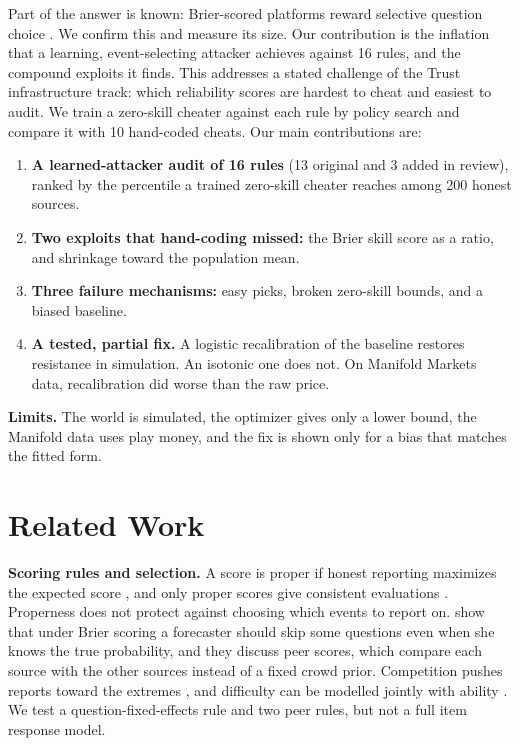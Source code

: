 \documentclass[10pt]{article}
\begin{document}
Part of the answer is known: Brier-scored platforms reward selective question choice \citep{sempere2021}. We confirm this and measure its size. Our contribution is the inflation that a learning, event-selecting attacker achieves against 16 rules, and the compound exploits it finds. This addresses a stated challenge of the Trust infrastructure track: which reliability scores are hardest to cheat and easiest to audit. We train a zero-skill cheater against each rule by policy search and compare it with 10 hand-coded cheats. Our main contributions are:
\begin{enumerate}\setlength{\itemsep}{1pt}\setlength{\parskip}{0pt}
\item \textbf{A learned-attacker audit of 16 rules} (13 original and 3 added in review), ranked by the percentile a trained zero-skill cheater reaches among 200 honest sources.
\item \textbf{Two exploits that hand-coding missed:} the Brier skill score as a ratio, and shrinkage toward the population mean.
\item \textbf{Three failure mechanisms:} easy picks, broken zero-skill bounds, and a biased baseline.
\item \textbf{A tested, partial fix.} A logistic recalibration of the baseline restores resistance in simulation. An isotonic one does not. On Manifold Markets data, recalibration did worse than the raw price.
\end{enumerate}
\textbf{Limits.} The world is simulated, the optimizer gives only a lower bound, the Manifold data uses play money, and the fix is shown only for a bias that matches the fitted form.

\section{Related Work}
\textbf{Scoring rules and selection.} A score is proper if honest reporting maximizes the expected score \citep{gneiting2007}, and only proper scores give consistent evaluations \citep{brocker2007}. Properness does not protect against choosing which events to report on. \citet{sempere2021} show that under Brier scoring a forecaster should skip some questions even when she knows the true probability, and they discuss peer scores, which compare each source with the other sources instead of a fixed crowd prior. Competition pushes reports toward the extremes \citep{lichtendahl2007,witkowski2018}, and difficulty can be modelled jointly with ability \citep{merkle2016,karger2025}. We test a question-fixed-effects rule and two peer rules, but not a full item response model.
\end{document}
